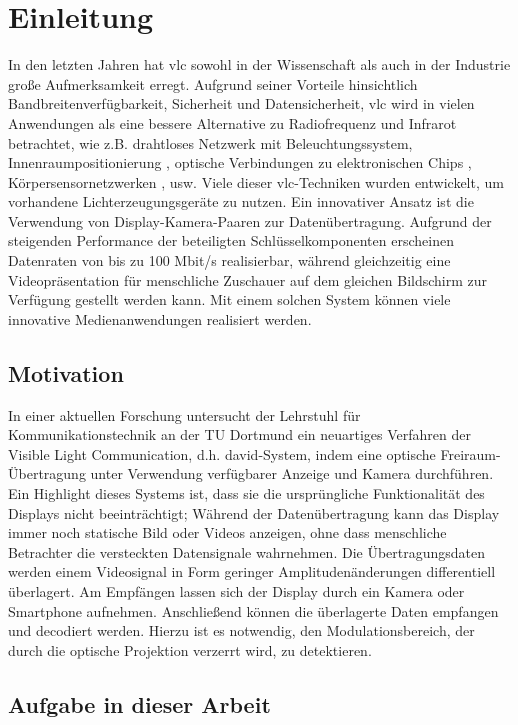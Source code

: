 \chapter{Einleitung} \label{cha:Einleitung}

In den letzten Jahren hat \gls{vlc} sowohl in der Wissenschaft als auch in der Industrie große Aufmerksamkeit erregt. Aufgrund seiner Vorteile hinsichtlich Bandbreitenverfügbarkeit, Sicherheit und Datensicherheit, \gls{vlc} wird in vielen Anwendungen als eine bessere Alternative zu Radiofrequenz und Infrarot betrachtet, wie z.B. drahtloses Netzwerk mit Beleuchtungssystem\cite{1205458}, Innenraumpositionierung \cite{4649677}, optische Verbindungen zu elektronischen Chips \cite{867694}, Körpersensornetzwerken \cite{bodysensor}, usw. Viele dieser \gls{vlc}-Techniken wurden entwickelt, um vorhandene Lichterzeugungsgeräte zu nutzen. Ein innovativer Ansatz ist die Verwendung von Display-Kamera-Paaren zur Datenübertragung. Aufgrund der steigenden Performance der beteiligten Schlüsselkomponenten erscheinen Datenraten von bis zu 100 Mbit/s realisierbar, während gleichzeitig eine Videopräsentation für menschliche Zuschauer auf dem gleichen Bildschirm zur Verfügung gestellt werden kann. Mit einem solchen System können viele innovative Medienanwendungen realisiert werden.

\section{Motivation} 

In einer aktuellen Forschung untersucht der Lehrstuhl für Kommunikationstechnik an der TU Dortmund ein neuartiges Verfahren der Visible Light Communication, d.h. \gls{david}-System, indem eine optische Freiraum-Übertragung unter Verwendung verfügbarer Anzeige und Kamera durchführen. Ein Highlight dieses Systems ist, dass sie die ursprüngliche Funktionalität des Displays nicht beeinträchtigt; Während der Datenübertragung kann das Display immer noch statische Bild oder Videos anzeigen, ohne dass menschliche Betrachter die versteckten Datensignale wahrnehmen. Die Übertragungsdaten werden einem Videosignal in Form geringer Amplitudenänderungen differentiell überlagert. Am Empfängen lassen sich der Display durch ein Kamera oder Smartphone aufnehmen. Anschließend können die überlagerte Daten empfangen und decodiert werden. Hierzu ist es notwendig, den Modulationsbereich, der durch die optische Projektion verzerrt wird, zu detektieren.

\section{Aufgabe in dieser Arbeit} 

